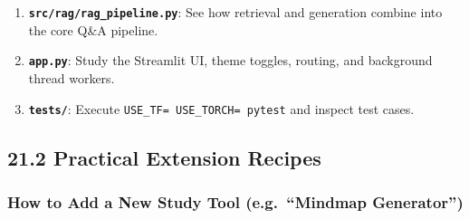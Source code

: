 \documentclass[
]{article}
\providecommand{\tightlist}{%
  \setlength{\itemsep}{0pt}\setlength{\parskip}{0pt}}
\begin{document}
\begin{enumerate}
  \begin{itemize}
  \tightlist
  \item
    Read \texttt{prompt\_\allowbreak templates.\allowbreak py} to study the system prompts.
  \item
    Read \texttt{llm\_\allowbreak manager.\allowbreak py} to see multi-provider routing (Groq,
    OpenAI, Ollama).
  \item
    Read \texttt{study\_\allowbreak generator.\allowbreak py} to understand JSON parsing and
    study artifact creation.
  \end{itemize}
\item
  \textbf{\texttt{src/\allowbreak rag/\allowbreak rag\_\allowbreak pipeline.\allowbreak py}}: See how retrieval and
  generation combine into the core Q\&A pipeline.
\item
  \textbf{\texttt{app.\allowbreak py}}: Study the Streamlit UI, theme toggles,
  routing, and background thread workers.
\item
  \textbf{\texttt{tests/\allowbreak }}: Execute
  \texttt{USE\_\allowbreak TF=\ \allowbreak USE\_\allowbreak TORCH=\ \allowbreak pytest} and inspect test cases.
\end{enumerate}

\subsection{21.2 Practical Extension
Recipes}\label{practical-extension-recipes}

\subsubsection{How to Add a New Study Tool (e.g.~``Mindmap
Generator'')}\label{how-to-add-a-new-study-tool-e.g.-mindmap-generator}
\end{document}
